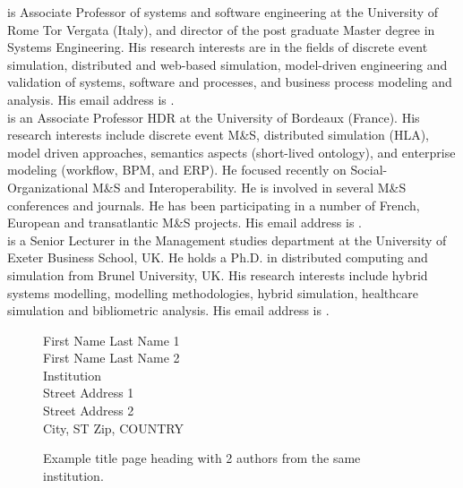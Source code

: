 \documentclass{wscpaperproc}
\theoremstyle{wsc}
\begin{document}
 is Associate Professor of systems and software engineering at the University of Rome Tor Vergata (Italy), and director of the post graduate Master degree in Systems Engineering. His research interests are in the fields of discrete event simulation, distributed and web-based simulation, model-driven engineering and validation of systems, software and processes, and business process modeling and analysis.  His email address is . \\

 is an Associate Professor HDR at the University of Bordeaux (France). His research interests include discrete event M\&S, distributed simulation (HLA), model driven approaches, semantics aspects (short-lived ontology), and enterprise modeling (workflow, BPM, and ERP). He focused recently on Social-Organizational M\&S and Interoperability. He is involved in several M\&S conferences and journals. He has been participating in a number of French, European and transatlantic M\&S projects. His email address is .\\

 is a Senior Lecturer in the Management studies department at the University of Exeter Business School, UK. He holds a Ph.D. in distributed computing and simulation from Brunel University, UK. His research interests include hybrid systems modelling, modelling methodologies, hybrid simulation, healthcare simulation and bibliometric analysis. His email address is .\\


\newpage

\begin{figure}[htb]
{
\centering
First Name Last Name 1 \\
First Name Last Name 2 \\
\vspace{12pt}
Institution \\
Street Address 1 \\
Street Address 2 \\
City, ST Zip, COUNTRY
\caption{Example title page heading with 2 authors from the same institution.\label{fig: 2 same}}
}
\end{figure}
\end{document}
